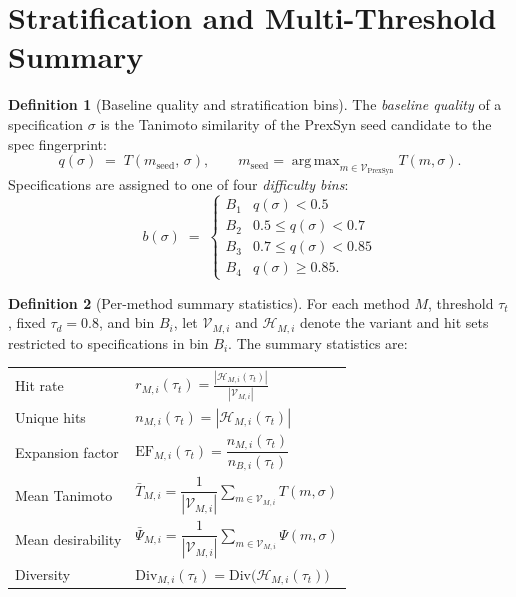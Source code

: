 \documentclass[11pt, a4paper]{article}
\theoremstyle{definition}
\newtheorem{definition}{Definition}[section]
\DeclareMathOperator*{\argmax}{arg\,max}
\newcommand{\1}[1]{\mathbf{1}\!\left[#1\right]}   %
\newcommand{\Hit}{\mathcal{H}}                      %
\newcommand{\Var}{\mathcal{V}}                      %
\begin{document}
\section{Stratification and Multi-Threshold Summary}
\label{sec:summary}

\begin{definition}[Baseline quality and stratification bins]
\label{def:bin}
The \emph{baseline quality} of a specification $\sigma$ is the Tanimoto
similarity of the PrexSyn seed candidate to the spec fingerprint:
\[
  q(\sigma) \;=\; T(m_\text{seed},\, \sigma),
  \qquad m_\text{seed} = \argmax_{m \in \Var_\text{PrexSyn}} T(m, \sigma).
\]
Specifications are assigned to one of four \emph{difficulty bins}:
\[
  b(\sigma) \;=\;
  \begin{cases}
    B_1 & q(\sigma) < 0.5 \\
    B_2 & 0.5 \leq q(\sigma) < 0.7 \\
    B_3 & 0.7 \leq q(\sigma) < 0.85 \\
    B_4 & q(\sigma) \geq 0.85.
  \end{cases}
\]
\end{definition}

\begin{definition}[Per-method summary statistics]
\label{def:summary}
For each method $M$, threshold $\tau_t$, fixed $\tau_d = 0.8$, and
bin $B_i$, let $\mathcal{V}_{M,i}$ and $\Hit_{M,i}$ denote the variant
and hit sets restricted to specifications in bin $B_i$.
The summary statistics are:

\medskip
\begin{tabular}{ll}
  Hit rate & $\displaystyle r_{M,i}(\tau_t) = \frac{|\Hit_{M,i}(\tau_t)|}{|\mathcal{V}_{M,i}|}$ \\[1.5ex]
  Unique hits & $\displaystyle n_{M,i}(\tau_t) = |\Hit_{M,i}(\tau_t)|$ \\[1.5ex]
  Expansion factor & $\displaystyle \text{EF}_{M,i}(\tau_t) = \dfrac{n_{M,i}(\tau_t)}{n_{B,i}(\tau_t)}$ \\[1.5ex]
  Mean Tanimoto & $\displaystyle \bar{T}_{M,i} = \dfrac{1}{|\mathcal{V}_{M,i}|} \sum_{m \in \mathcal{V}_{M,i}} T(m,\sigma)$ \\[1.5ex]
  Mean desirability & $\displaystyle \bar{\Psi}_{M,i} = \dfrac{1}{|\mathcal{V}_{M,i}|} \sum_{m \in \mathcal{V}_{M,i}} \Psi(m,\sigma)$ \\[1.5ex]
  Diversity & $\displaystyle \text{Div}_{M,i}(\tau_t) = \text{Div}\!\bigl(\Hit_{M,i}(\tau_t)\bigr)$
\end{tabular}
\end{definition}
\end{document}

